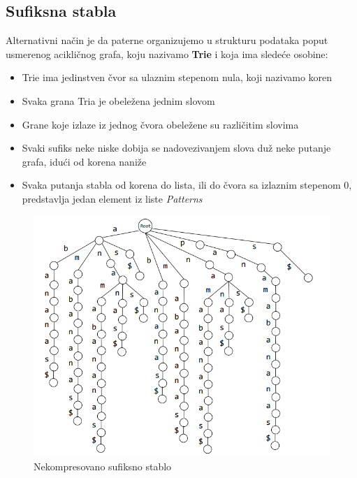 \subsection{Sufiksna stabla}
Alternativni način je da paterne organizujemo u strukturu podataka poput usmerenog acikličnog grafa, koju nazivamo \textbf{Trie} i koja ima sledeće osobine:

\begin{itemize}
    \item Trie ima jedinstven čvor sa ulaznim stepenom nula, koji nazivamo koren
    \item Svaka grana Tria je obeležena jednim slovom
    \item Grane koje izlaze iz jednog čvora obeležene su različitim slovima
    \item Svaki sufiks neke niske dobija se nadovezivanjem slova duž neke putanje grafa, idući od korena naniže
    \item Svaka putanja stabla od korena do lista, ili do čvora sa izlaznim stepenom 0, predstavlja jedan element iz liste \textit{Patterns}
\end{itemize}

\begin{figure}[h!]
\centering
\includegraphics[scale=0.5]{poglavlja/9/slike/sufiksnoStabloNekompresovano.png}
\caption{Nekompresovano sufiksno stablo}
\label{slika:X}
\end{figure}


